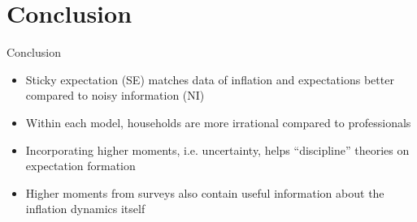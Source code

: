 \documentclass{beamer}
\begin{document}



\section{Conclusion}

\begin{frame}{Conclusion}
	\begin{itemize}
		\item Sticky expectation (SE) matches data of inflation and expectations better compared to noisy information (NI) 
		\item Within each model,  households are more irrational compared to professionals
		\item Incorporating higher moments, i.e. uncertainty,  helps ``discipline'' theories on expectation formation
		\item  Higher moments from surveys also contain useful information about the inflation dynamics itself
	\end{itemize}	
\end{frame}




\end{document}
